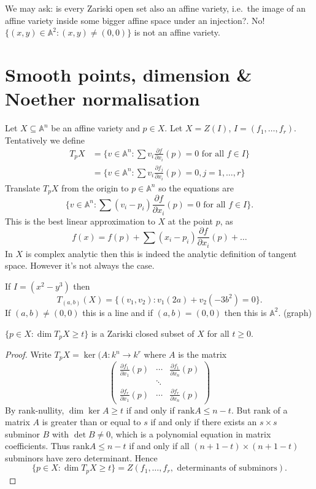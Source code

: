 \documentclass[a4paper]{article}
\renewcommand{\A}{\mathbb{A}}
\begin{document}
We may ask: is every Zariski open set also an affine variety, i.e.\ the image of an affine variety inside some bigger affine space under an injection?. No! \(\{(x, y) \in \A^2: (x, y) \neq (0, 0)\}\) is not an affine variety.

\section{Smooth points, dimension \& Noether normalisation}

Let \(X \subseteq \A^n\) be an affine variety and \(p \in X\). Let \(X = Z(I)\), \(I = (f_1, \dots, f_r)\). Tentatively we define
\begin{align*}
  T_pX
  &= \{v \in \A^n: \sum v_i \frac{\partial f}{\partial x_i}(p) = 0 \text{ for all } f \in I\} \\
  &= \{v \in \A^n: \sum v_i \frac{\partial f_j}{\partial x_i}(p) = 0, j = 1, \dots, r\}
\end{align*}
Translate \(T_pX\) from the origin to \(p \in \A^n\) so the equations are
\[
  \{v \in \A^n: \sum (v_i - p_i) \frac{\partial f}{\partial x_i}(p) = 0 \text{ for all } f \in I\}.
\]
This is the best linear approximation to \(X\) at the point \(p\), as
\[
  f(x) = f(p) + \sum (x_i - p_i) \frac{\partial f}{\partial x_i}(p) + \dots
\]
In \(X\) is complex analytic then this is indeed the analytic definition of tangent space. However it's not always the case.

\begin{eg}
  If \(I = (x^2 - y^3)\) then
  \[
    T_{(a, b)}(X) = \{(v_1, v_2): v_1(2a) + v_2(-3b^2) = 0\}.
  \]
  If \((a, b) \neq (0, 0)\) this is a line and if \((a, b) = (0, 0)\) then this is \(\A^2\). (graph)
\end{eg}

\begin{lemma}
  \(\{p \in X: \dim T_pX \geq t\}\) is a Zariski closed subset of \(X\) for all \(t \geq 0\).
\end{lemma}

\begin{proof}
  Write \(T_p X = \ker (A: k^n \to k^r\) where \(A\) is the matrix
  \[
    \begin{pmatrix}
      \frac{\partial f_1}{\partial x_1}(p) & \cdots & \frac{\partial f_1}{\partial x_n}(p) \\
      & \ddots \\
      \frac{\partial f_r}{\partial x_1}(p) & \cdots & \frac{\partial f_r}{\partial x_n}(p)
    \end{pmatrix}
  \]
  By rank-nullity, \(\dim \ker A \geq t\) if and only if \(\text{rank} A \leq n - t\). But rank of a matrix \(A\) is greater than or equal to \(s\) if and only if there exists an \(s \times s\) subminor \(B\) with \(\det B \neq 0\), which is a polynomial equation in matrix coefficients. Thus \(\text{rank} A \leq n - t\) if and only if all \((n + 1 - t) \times (n + 1 - t)\) subminors have zero determinant. Hence
  \[
    \{p \in X: \dim T_pX \geq t\} = Z(f_1, \dots, f_r, \text{  determinants of subminors}).
  \]
\end{proof}
\end{document}
